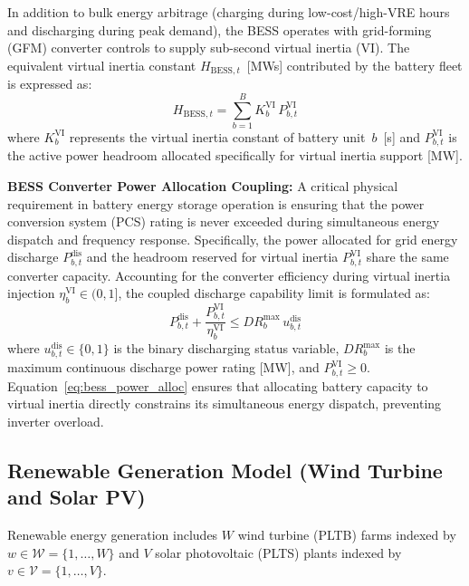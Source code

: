 \documentclass[journal]{IEEEtran}
\begin{document}
In addition to bulk energy arbitrage (charging during low-cost/high-VRE hours and discharging during peak demand), the BESS operates with grid-forming (GFM) converter controls to supply sub-second virtual inertia (VI). The equivalent virtual inertia constant $H_{\text{BESS},t}$~[MWs] contributed by the battery fleet is expressed as:
\begin{equation}
  H_{\text{BESS},t} = \sum_{b=1}^{B} K_b^{\text{VI}}\,P_{b,t}^{\text{VI}}
  \label{eq:bess_vi}
\end{equation}
where $K_b^{\text{VI}}$ represents the virtual inertia constant of battery unit~$b$~[s] and $P_{b,t}^{\text{VI}}$ is the active power headroom allocated specifically for virtual inertia support [MW].

\textbf{BESS Converter Power Allocation Coupling:}
A critical physical requirement in battery energy storage operation is ensuring that the power conversion system (PCS) rating is never exceeded during simultaneous energy dispatch and frequency response. Specifically, the power allocated for grid energy discharge $P_{b,t}^{\text{dis}}$ and the headroom reserved for virtual inertia $P_{b,t}^{\text{VI}}$ share the same converter capacity. Accounting for the converter efficiency during virtual inertia injection $\eta_b^{\text{VI}} \in (0, 1]$, the coupled discharge capability limit is formulated as:
\begin{equation}
  P_{b,t}^{\text{dis}} + \frac{P_{b,t}^{\text{VI}}}{\eta_b^{\text{VI}}} \leq DR_b^{\max}\,u_{b,t}^{\text{dis}}
  \label{eq:bess_power_alloc}
\end{equation}
where $u_{b,t}^{\text{dis}} \in \{0, 1\}$ is the binary discharging status variable, $DR_b^{\max}$ is the maximum continuous discharge power rating [MW], and $P_{b,t}^{\text{VI}} \geq 0$. Equation~\eqref{eq:bess_power_alloc} ensures that allocating battery capacity to virtual inertia directly constrains its simultaneous energy dispatch, preventing inverter overload.

\subsection{Renewable Generation Model (Wind Turbine and Solar PV)}

Renewable energy generation includes $W$ wind turbine (PLTB) farms indexed by $w \in \mathcal{W} = \{1, \dots, W\}$ and $V$ solar photovoltaic (PLTS) plants indexed by $v \in \mathcal{V} = \{1, \dots, V\}$.
\end{document}
